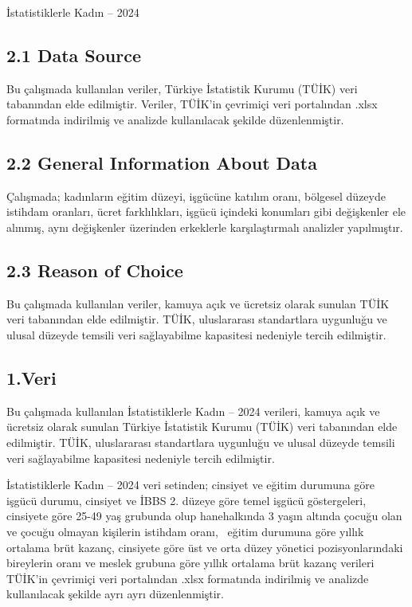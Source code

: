 \documentclass[
  11pt,
  a4paper,
  DIV=11,
  numbers=noendperiod]{scrartcl}
\begin{document}
İstatistiklerle Kadın -- 2024

\subsection{2.1 Data Source}\label{data-source}

Bu çalışmada kullanılan veriler, Türkiye İstatistik Kurumu (TÜİK) veri
tabanından elde edilmiştir. Veriler, TÜİK'in çevrimiçi veri portalından
.xlsx formatında indirilmiş ve analizde kullanılacak şekilde
düzenlenmiştir.

\subsection{2.2 General Information About
Data}\label{general-information-about-data}

Çalışmada; kadınların eğitim düzeyi, işgücüne katılım oranı, bölgesel
düzeyde istihdam oranları, ücret farklılıkları, işgücü içindeki
konumları gibi değişkenler ele alınmış, aynı değişkenler üzerinden
erkeklerle karşılaştırmalı analizler yapılmıştır.

\subsection{2.3 Reason of Choice}\label{reason-of-choice}

Bu çalışmada kullanılan veriler, kamuya açık ve ücretsiz olarak sunulan
TÜİK veri tabanından elde edilmiştir. TÜİK, uluslararası standartlara
uygunluğu ve ulusal düzeyde temsili veri sağlayabilme kapasitesi
nedeniyle tercih edilmiştir.

\subsection{1.Veri}\label{veri}

Bu çalışmada kullanılan İstatistiklerle Kadın -- 2024 verileri, kamuya
açık ve ücretsiz olarak sunulan Türkiye İstatistik Kurumu (TÜİK) veri
tabanından elde edilmiştir. TÜİK, uluslararası standartlara uygunluğu ve
ulusal düzeyde temsili veri sağlayabilme kapasitesi nedeniyle tercih
edilmiştir.

İstatistiklerle Kadın -- 2024 veri setinden; cinsiyet ve eğitim durumuna
göre işgücü durumu, cinsiyet ve İBBS 2. düzeye göre temel işgücü
göstergeleri, cinsiyete göre 25-49 yaş grubunda olup hanehalkında 3
yaşın altında çocuğu olan ve çocuğu olmayan kişilerin istihdam oranı,
~eğitim durumuna göre yıllık ortalama brüt kazanç, cinsiyete göre üst ve
orta düzey yönetici pozisyonlarındaki bireylerin oranı ve meslek grubuna
göre yıllık ortalama brüt kazanç verileri TÜİK'in çevrimiçi veri
portalından .xlsx formatında indirilmiş ve analizde kullanılacak şekilde
ayrı ayrı düzenlenmiştir.
\end{document}
